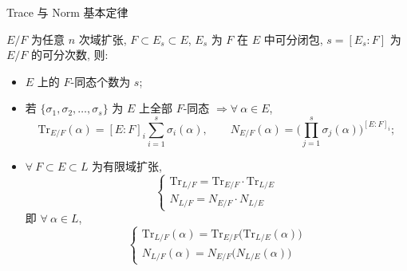 \begin{frame}{Trace 与 Norm 基本定律}

\begin{thm}
$E/F$ 为任意 $n$ 次域扩张, $F \subset E_s \subset E$, $E_s$ 为 $F$ 在 $E$
中可分闭包, $s = [E_s:F]$ 为 $E/F$ 的可分次数, 则:
\begin{itemize}
\item[(i)] $E$ 上的 $F$-同态个数为 $s$;
\item[(ii)] 若 $\{ \sigma_1, \sigma_2, \dots, \sigma_s \}$ 为 $E$ 上全部
  $F$-同态 $\Longrightarrow \forall\ \alpha \in E$,
  \[
  \mathrm{Tr}_{E/F}(\alpha) = [E:F]_i \sum_{i=1}^{s} \sigma_i(\alpha),
  \qquad
  N_{E/F}(\alpha) = \Big( \prod_{j=1}^{s} \sigma_j(\alpha) \Big)^{[E:F]_i};
  \]
\item[(iii)] $\forall\ F \subset E \subset L$ 为有限域扩张,
  \[
  \begin{cases}
  \mathrm{Tr}_{L/F} = \mathrm{Tr}_{E/F} \cdot \mathrm{Tr}_{L/E} \\
  N_{L/F} = N_{E/F} \cdot N_{L/E}
  \end{cases}
  \]
  即 $\forall\ \alpha \in L$,
  \[
  \begin{cases}
  \mathrm{Tr}_{L/F}(\alpha) = \mathrm{Tr}_{E/F}\big(\mathrm{Tr}_{L/E}(\alpha)\big) \\
  N_{L/F}(\alpha) = N_{E/F}\big(N_{L/E}(\alpha)\big)
  \end{cases}
  \]
\end{itemize}
\end{thm}

\end{frame}


